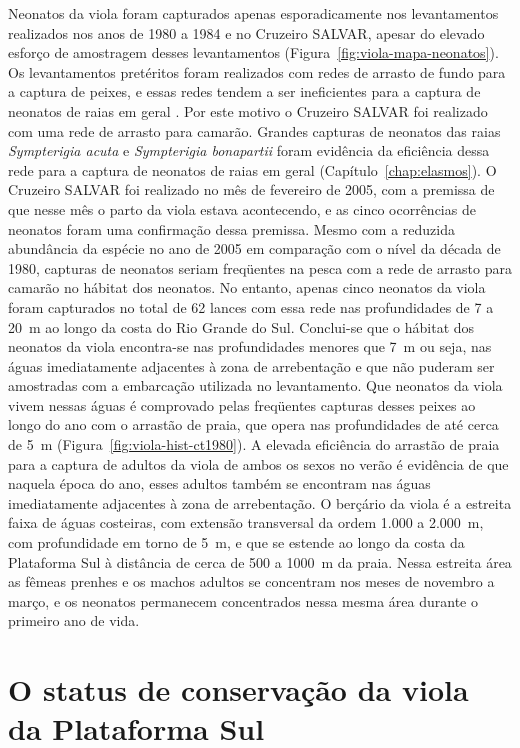 \documentclass[a4paper,11pt,twoside,showtrims,onecolumn,openright,final]{memoir}
\begin{document}
Neonatos da viola foram capturados apenas esporadicamente nos 
levantamentos realizados nos anos de 1980 a 1984 e no Cruzeiro SALVAR, 
apesar do elevado esforço de amostragem desses levantamentos (Figura~\ref{fig:viola-mapa-neonatos}). 
Os levantamentos pretéritos foram realizados com redes de arrasto de fundo 
para a captura de peixes, e essas redes tendem a ser ineficientes para a 
captura de neonatos de raias em geral \citep{oddone2004}. %
Por este motivo o Cruzeiro SALVAR foi realizado com uma rede de arrasto 
para camarão. Grandes capturas de neonatos das raias \emph{Sympterigia acuta}
e \emph{Sympterigia bonapartii} foram evidência da eficiência dessa rede para 
a captura de neonatos de raias em geral (Capítulo~\ref{chap:elasmos}). %
O Cruzeiro SALVAR foi realizado no mês de fevereiro de 2005, com a premissa 
de que nesse mês o parto da viola estava acontecendo, e as cinco ocorrências 
de neonatos foram uma confirmação dessa premissa. Mesmo com a reduzida 
abundância da espécie no ano de 2005 em comparação com o nível da década 
de 1980, capturas de neonatos seriam freqüentes na pesca com a rede de arrasto 
para camarão no hábitat dos neonatos. No entanto, apenas cinco neonatos da 
viola foram capturados no total de 62 lances com essa rede nas profundidades 
de 7 a 20~m ao longo da costa do Rio Grande do Sul. Conclui-se que o hábitat 
dos neonatos da viola encontra-se nas profundidades menores que 7~m ou seja, 
nas águas imediatamente adjacentes à zona de arrebentação e que não puderam ser 
amostradas com a embarcação utilizada no levantamento. Que neonatos da viola vivem 
nessas águas é comprovado pelas freqüentes capturas desses peixes ao longo do ano 
com o arrastão de praia, que opera nas profundidades de até cerca de 5~m (Figura~\ref{fig:viola-hist-ct1980}).
A elevada eficiência do arrastão de praia para a captura de adultos da viola 
de ambos os sexos no verão é evidência de que naquela época do ano, esses adultos 
também se encontram nas águas imediatamente adjacentes à zona de arrebentação. 
O berçário da viola é a estreita faixa de águas costeiras, com extensão 
transversal da ordem 1.000 a 2.000~m, com profundidade em torno de 5~m, e 
que se estende ao longo da costa da Plataforma Sul à distância de cerca 
de 500 a 1000~m da praia. Nessa estreita área as fêmeas prenhes e os machos 
adultos se concentram nos meses de novembro a março, e os neonatos permanecem 
concentrados nessa mesma área durante o primeiro ano de vida. 

\section*{O status de conservação da viola da Plataforma Sul}
\end{document}
